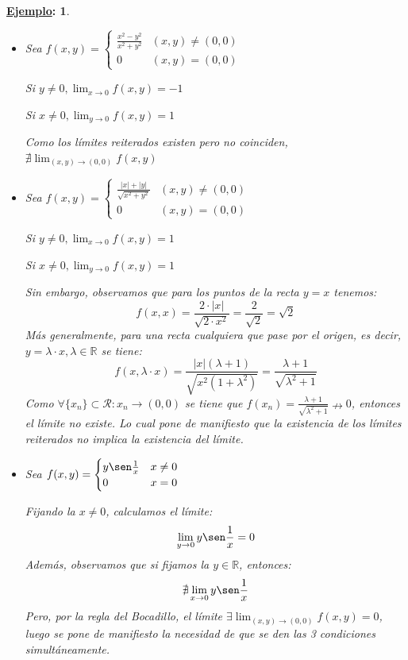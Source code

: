 \documentclass[10pt,a4paper,openright]{book}
\theoremstyle{break}
\newtheorem*{ej}{\underline{Ejemplo}:}
\begin{document}
\begin{ej}
\begin{itemize}
\item Sea $f(x,y) = \begin{cases} \frac{x^2 - y^2}{x^2 + y^2} & (x,y) \neq (0,0) \\ 0 & (x,y) = (0,0)\end{cases}$

Si $y \neq 0, \lim_{x \to 0} f(x,y) = -1$

Si $x \neq 0, \lim_{y \to 0} f(x,y) = 1$

Como los límites reiterados existen pero no coinciden, $\nexists \lim_{(x,y) \to (0,0)} f(x,y)$

\item Sea $f(x,y) = \begin{cases} \frac{|x| + |y|}{\sqrt{x^2 + y^2}}  & (x,y) \neq (0,0) \\ 0 & (x,y) = (0,0)\end{cases}$

Si $y \neq 0, \lim_{x \to 0} f(x,y) = 1$

Si $x \neq 0, \lim_{y \to 0} f(x,y) = 1$

Sin embargo, observamos que para los puntos de la recta $y=x$ tenemos:
$$f(x,x) = \frac{2 \cdot |x|}{\sqrt{2 \cdot x^2}} = \frac{2}{\sqrt{2}} = \sqrt{2}$$
Más generalmente, para una recta cualquiera que pase por el origen, es decir, $y = \lambda \cdot x, \lambda \in \mathbb{R}$ se tiene:
$$f(x, \lambda \cdot x) = \frac{|x|(\lambda + 1)}{\sqrt{x^2 (1 + \lambda^2)}} = \frac{\lambda + 1}{\sqrt{\lambda^2 + 1 }}$$
Como $\forall\{x_n\}\subset \mathcal{R}: x_n \rightarrow (0,0)$ se tiene que $f(x_n)=\frac{\lambda + 1}{\sqrt{\lambda^2 + 1}} \nrightarrow 0$, entonces el límite no existe. Lo cual pone de manifiesto que la existencia de los límites reiterados no implica la existencia del límite.
\item Sea $f(x,y) = \begin{cases} y \sen \frac{1}{x} & x \neq 0 \\ 0 & x = 0 \end{cases}$

Fijando la $x \neq 0$, calculamos el límite:
$$\lim_{y \to 0}  y \sen \frac{1}{x} = 0$$
Además, observamos que si fijamos la $y \in \mathbb{R}$, entonces:
$$\nexists \lim_{x \to 0}  y \sen \frac{1}{x} $$
Pero, por la regla del Bocadillo, el  límite $\exists \lim_{(x,y) \to (0,0)} f(x,y) = 0$, luego se pone de manifiesto la necesidad de que se den las 3 condiciones simultáneamente.
\end{itemize}
\end{ej}
\end{document}
